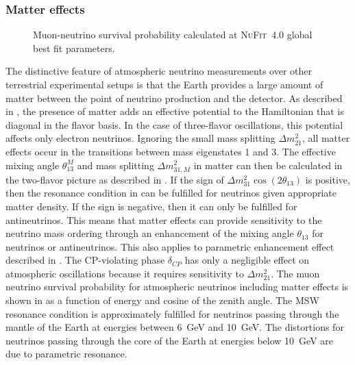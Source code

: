 \subsubsection{Matter effects}
\begin{figure}
    \centering
    
    \caption{Muon-neutrino survival probability calculated at \textsc{NuFit~4.0}\cite{nufit40} global best fit parameters.}
    \label{fig:three-flavor-oscprob}
\end{figure}
The distinctive feature of atmospheric neutrino measurements over other terrestrial experimental setups is that the Earth provides a large amount of matter between the point of neutrino production and the detector.
As described in , the presence of matter adds an effective potential to the Hamiltonian that is diagonal in the flavor basis.
In the case of three-flavor oscillations, this potential affects only electron neutrinos.
Ignoring the small mass splitting $\Delta m^2_{21}$, all matter effects occur in the transitions between mass eigenstates 1 and 3.
The effective mixing angle $\theta_{13}^M$ and mass splitting $\Delta m^2_{31,M}$ in matter can then be calculated in the two-flavor picture as described in .
If the sign of $\Delta m^2_{31}\cos(2\theta_{13})$ is positive, then the resonance condition in  can be fulfilled for neutrinos given appropriate matter density.
If the sign is negative, then it can only be fulfilled for antineutrinos.
This means that matter effects can provide sensitivity to the neutrino mass ordering through an enhancement of the mixing angle $\theta_{13}$ for neutrinos or antineutrinos.
This also applies to parametric enhancement effect described in .
The CP-violating phase $\delta_{CP}$ has only a negligible effect on atmospheric oscillations because it requires sensitivity to $\Delta m^2_{21}$.
The muon neutrino survival probability for atmospheric neutrinos including matter effects is shown in  as a function of energy and cosine of the zenith angle.
The MSW resonance condition is approximately fulfilled for neutrinos passing through the mantle of the Earth at energies between \SI{6}{\giga\electronvolt} and \SI{10}{\giga\electronvolt}.
The distortions for neutrinos passing through the core of the Earth at energies below \SI{10}{\giga\electronvolt} are due to parametric resonance.

